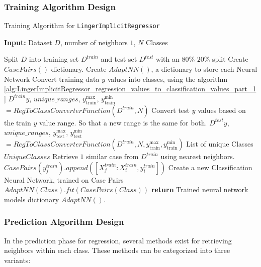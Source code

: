 \documentclass[a4paper, 12pt]{report}
\begin{document}
\subsubsection{Training Algorithm Design}
\begin{algorithm}[H]
    \caption{Training Algorithm for \texttt{LingerImplicitRegressor}}
    \label{alg:LingerImplicitRegressor_train}
    \textbf{Input:} Dataset $D$, number of neighbors $1$, $N$ Classes 
    \begin{algorithmic}
        \State Split $D$ into training set $D^{train}$ and test set $D^{test}$ with an $80\%$-$20\%$ split
        \State Create $CasePairs()$ dictionary.
        \State Create $AdaptNN()$, a dictionary to store each Neural Network
        \State Convert training data $y$ values into classes, using the algorithm \ref{alg:LingerImplicitRegressor_regression_values_to_classification_values_part_1}
        \State $D^{train}y$, $unique\_ranges$, $y_{\text{train}}^\text{max}$, $y_{\text{train}}^\text{min}$ $= Reg To Class Converter Function(D^{train}, N)$
        \State Convert test $y$ values based on the train $y$ value range. So that a new range is the same for both.
        \State $D^{test}y$, $unique\_ranges$, $y_{\text{test}}^\text{max}$, $y_{\text{test}}^\text{min}$ $= Reg To Class Converter Function(D^{train}, N, y_{\text{train}}^\text{max}, y_{\text{train}}^\text{min})$
        \State List of unique Classes $UniqueClasses$
            \State Retrieve $1$ similar case from $D^{train}$ using nearest neighbors.
                \State $CasePairs(y^{train}_j).append([X^{train}_j:X^{train}_i, y^{train}_i])$
            \EndFor
        \EndFor
            \State Create a new Classification Neural Network, trained on Case Pairs
            \State $AdaptNN(Class).fit(CasePairs(Class))$
        \EndFor
        \State \textbf{return} Trained neural network models dictionary $AdaptNN()$.
    \end{algorithmic}
\end{algorithm}
\clearpage

\subsubsection{Prediction Algorithm Design}
\label{sec:lingerImplicit_regression_baseV1V2_model}

In the prediction phase for regression, several methods exist for retrieving neighbors within each class. These methods can be categorized into three variants:
\end{document}
